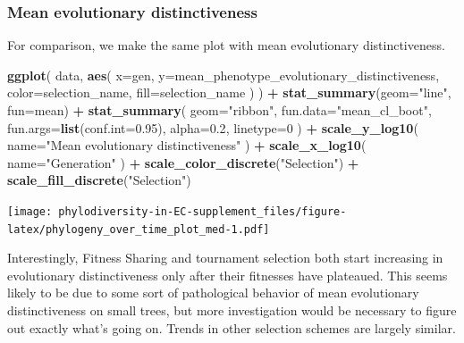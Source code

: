 \documentclass[]{book}
\newenvironment{Shaded}{\begin{snugshade}}{\end{snugshade}}
\newcommand{\DataTypeTok}[1]{\textcolor[rgb]{0.13,0.29,0.53}{#1}}
\newcommand{\DecValTok}[1]{\textcolor[rgb]{0.00,0.00,0.81}{#1}}
\newcommand{\FloatTok}[1]{\textcolor[rgb]{0.00,0.00,0.81}{#1}}
\newcommand{\KeywordTok}[1]{\textcolor[rgb]{0.13,0.29,0.53}{\textbf{#1}}}
\newcommand{\NormalTok}[1]{#1}
\newcommand{\OperatorTok}[1]{\textcolor[rgb]{0.81,0.36,0.00}{\textbf{#1}}}
\newcommand{\StringTok}[1]{\textcolor[rgb]{0.31,0.60,0.02}{#1}}
\begin{document}
\hypertarget{mean-evolutionary-distinctiveness}{%
\subsubsection{Mean evolutionary distinctiveness}\label{mean-evolutionary-distinctiveness}}

For comparison, we make the same plot with mean evolutionary distinctiveness.

\begin{Shaded}
\begin{Highlighting}[]
\KeywordTok{ggplot}\NormalTok{(}
\NormalTok{    data,}
    \KeywordTok{aes}\NormalTok{(}
      \DataTypeTok{x=}\NormalTok{gen,}
      \DataTypeTok{y=}\NormalTok{mean_phenotype_evolutionary_distinctiveness,}
      \DataTypeTok{color=}\NormalTok{selection_name,}
      \DataTypeTok{fill=}\NormalTok{selection_name}
\NormalTok{    )}
\NormalTok{  ) }\OperatorTok{+}
\StringTok{  }\KeywordTok{stat_summary}\NormalTok{(}\DataTypeTok{geom=}\StringTok{"line"}\NormalTok{, }\DataTypeTok{fun=}\NormalTok{mean) }\OperatorTok{+}
\StringTok{  }\KeywordTok{stat_summary}\NormalTok{(}
    \DataTypeTok{geom=}\StringTok{"ribbon"}\NormalTok{,}
    \DataTypeTok{fun.data=}\StringTok{"mean_cl_boot"}\NormalTok{,}
    \DataTypeTok{fun.args=}\KeywordTok{list}\NormalTok{(}\DataTypeTok{conf.int=}\FloatTok{0.95}\NormalTok{),}
    \DataTypeTok{alpha=}\FloatTok{0.2}\NormalTok{,}
    \DataTypeTok{linetype=}\DecValTok{0}
\NormalTok{  ) }\OperatorTok{+}
\StringTok{  }\KeywordTok{scale_y_log10}\NormalTok{(}
    \DataTypeTok{name=}\StringTok{"Mean evolutionary distinctiveness"}
\NormalTok{  ) }\OperatorTok{+}
\StringTok{  }\KeywordTok{scale_x_log10}\NormalTok{(}
    \DataTypeTok{name=}\StringTok{"Generation"}
\NormalTok{  ) }\OperatorTok{+}
\StringTok{  }\KeywordTok{scale_color_discrete}\NormalTok{(}\StringTok{"Selection"}\NormalTok{) }\OperatorTok{+}
\StringTok{  }\KeywordTok{scale_fill_discrete}\NormalTok{(}\StringTok{"Selection"}\NormalTok{)}
\end{Highlighting}
\end{Shaded}

\texttt{[image: phylodiversity-in-EC-supplement\_files/figure-latex/phylogeny\_over\_time\_plot\_med-1.pdf]}

Interestingly, Fitness Sharing and tournament selection both start increasing in evolutionary distinctiveness only after their fitnesses have plateaued. This seems likely to be due to some sort of pathological behavior of mean evolutionary distinctiveness on small trees, but more investigation would be necessary to figure out exactly what's going on. Trends in other selection schemes are largely similar.
\end{document}
